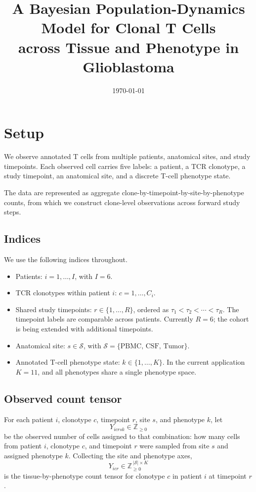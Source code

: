\documentclass[11pt]{article}
\title{\bfseries\color{accent}\Large A Bayesian Population-Dynamics Model for
Clonal T Cells\\[2pt] across Tissue and Phenotype in Glioblastoma}
\date{\today}
\newcommand{\Znn}{\mathbb{Z}_{\geq 0}}            %
\newcommand{\Ssp}{\mathcal{S}}                    %
\theoremstyle{definition}
\begin{document}
\maketitle

\section{Setup}

We observe annotated T cells from multiple patients, anatomical sites, and
study timepoints. Each observed cell carries five labels: a patient, a TCR
clonotype, a study timepoint, an anatomical site, and a discrete T-cell
phenotype state.

The data are represented as aggregate
clone-by-timepoint-by-site-by-phenotype counts, from which we construct
clone-level observations across forward study steps.

\subsection{Indices}

We use the following indices throughout.
\begin{itemize}[leftmargin=1.4em, itemsep=2pt]
  \item Patients: $i = 1,\ldots,I$, with $I = 6$.
  \item TCR clonotypes within patient $i$: $c = 1,\ldots,C_i$.
  \item Shared study timepoints: $r \in \{1,\ldots,R\}$, ordered as
        $\tau_1 < \tau_2 < \cdots < \tau_R$. The timepoint labels are
        comparable across patients. Currently $R = 6$; the cohort is being
        extended with additional timepoints.
  \item Anatomical site: $s \in \Ssp$, with
        $\Ssp = \{\mathrm{PBMC},\, \mathrm{CSF},\, \mathrm{Tumor}\}$.
  \item Annotated T-cell phenotype state: $k \in \{1,\ldots,K\}$. In the
        current application $K = 11$, and all phenotypes share a single
        phenotype space.
\end{itemize}

\subsection{Observed count tensor}

For each patient $i$, clonotype $c$, timepoint $r$, site $s$, and phenotype
$k$, let
\[
  Y_{icrsk} \in \Znn
\]
be the observed number of cells assigned to that combination: how many cells
from patient $i$, clonotype $c$, and timepoint $r$ were sampled from site $s$
and assigned phenotype $k$. Collecting the site and phenotype axes,
\[
  Y_{icr} \in \Znn^{\,|\Ssp| \times K}
\]
is the tissue-by-phenotype count tensor for clonotype $c$ in patient $i$ at
timepoint $r$.
\end{document}
